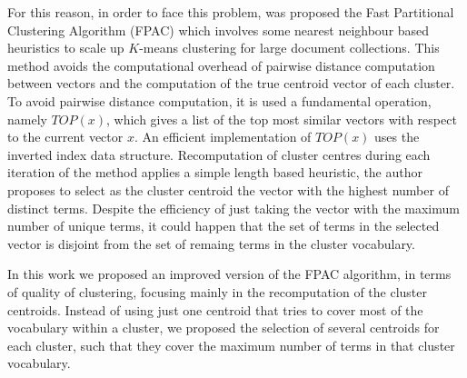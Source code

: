 \documentclass[runningheads]{llncs}
\begin{document}
For this reason, in order to face this problem, was proposed the Fast Partitional Clustering Algorithm (FPAC) \cite{ganguly_2018} which
involves some nearest neighbour based heuristics to
scale up $K$-means clustering for large document collections.
This method avoids the computational overhead of pairwise distance computation between vectors and the computation of the true centroid vector of each cluster.
To avoid pairwise distance computation, it is used a fundamental operation,
namely $TOP(x)$, which gives a list of the top most similar vectors
with respect to the current vector $x$. An efficient implementation
of $TOP(x)$ uses the inverted index data structure.
Recomputation of cluster centres during each iteration of the method
applies a simple length based heuristic,
the author proposes to select as the cluster centroid the 
vector with the highest number of distinct terms. Despite the efficiency
of just taking the vector with the maximum number of unique terms,
it could happen that the set of terms in the selected vector is disjoint from
the set of remaing terms in the cluster vocabulary.

In this work we proposed an improved version of the FPAC algorithm,
in terms of quality of clustering, focusing mainly in the recomputation of the cluster centroids. Instead of using just one centroid that tries to
cover most of the vocabulary within a cluster, we proposed the selection
of several centroids for each cluster, such that they cover the maximum number of terms 
in that cluster vocabulary.
\end{document}
